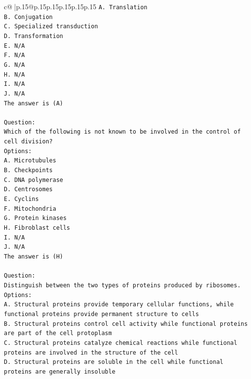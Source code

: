 \documentclass{article}
\begin{document}
{\begin{supertabular}{c@{$\;$}|p{.15\linewidth}@{}p{.15\linewidth}p{.15\linewidth}p{.15\linewidth}p{.15\linewidth}p{.15\linewidth}}
{{{\texttt{A. Translation} \\
\texttt{B. Conjugation} \\
\texttt{C. Specialized transduction} \\
\texttt{D. Transformation} \\
\texttt{E. N/A} \\
\texttt{F. N/A} \\
\texttt{G. N/A} \\
\texttt{H. N/A} \\
\texttt{I. N/A} \\
\texttt{J. N/A} \\
\texttt{The answer is (A)} \\
\\ 
\texttt{Question:} \\
\texttt{Which of the following is not known to be involved in the control of cell division?} \\
\texttt{Options:} \\
\texttt{A. Microtubules} \\
\texttt{B. Checkpoints} \\
\texttt{C. DNA polymerase} \\
\texttt{D. Centrosomes} \\
\texttt{E. Cyclins} \\
\texttt{F. Mitochondria} \\
\texttt{G. Protein kinases} \\
\texttt{H. Fibroblast cells} \\
\texttt{I. N/A} \\
\texttt{J. N/A} \\
\texttt{The answer is (H)} \\
\\ 
\texttt{Question:} \\
\texttt{Distinguish between the two types of proteins produced by ribosomes.} \\
\texttt{Options:} \\
\texttt{A. Structural proteins provide temporary cellular functions, while functional proteins provide permanent structure to cells} \\
\texttt{B. Structural proteins control cell activity while functional proteins are part of the cell protoplasm} \\
\texttt{C. Structural proteins catalyze chemical reactions while functional proteins are involved in the structure of the cell} \\
\texttt{D. Structural proteins are soluble in the cell while functional proteins are generally insoluble} \\
}}}
\end{supertabular}}
\end{document}
